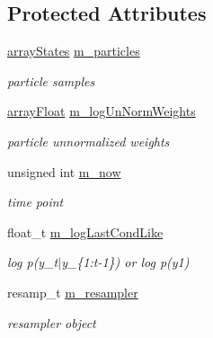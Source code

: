 \subsection*{Protected Attributes}
\begin{DoxyCompactItemize}
\item 
\mbox{\label{classBSFilter_acb5460829dc8215ce2917a24850da444}} 
\hyperlink{classBSFilter_a0afe61a08de8d178647b23beae9eef16}{array\+States} \hyperlink{classBSFilter_acb5460829dc8215ce2917a24850da444}{m\+\_\+particles}
\begin{DoxyCompactList}\small\item\em particle samples \end{DoxyCompactList}\item 
\mbox{\label{classBSFilter_a87e73c82920c3d40b63b544f91b546dd}} 
\hyperlink{classBSFilter_a14a572439ddfe7d2b4157d4c91617981}{array\+Float} \hyperlink{classBSFilter_a87e73c82920c3d40b63b544f91b546dd}{m\+\_\+log\+Un\+Norm\+Weights}
\begin{DoxyCompactList}\small\item\em particle unnormalized weights \end{DoxyCompactList}\item 
\mbox{\label{classBSFilter_a2ff792d36cac3dfb67fad4fb1f49f63c}} 
unsigned int \hyperlink{classBSFilter_a2ff792d36cac3dfb67fad4fb1f49f63c}{m\+\_\+now}
\begin{DoxyCompactList}\small\item\em time point \end{DoxyCompactList}\item 
\mbox{\label{classBSFilter_a488e36bdbc661d121664ca352ef942e8}} 
float\+\_\+t \hyperlink{classBSFilter_a488e36bdbc661d121664ca352ef942e8}{m\+\_\+log\+Last\+Cond\+Like}
\begin{DoxyCompactList}\small\item\em log p(y\+\_\+t$\vert$y\+\_\+\{1\+:t-\/1\}) or log p(y1) \end{DoxyCompactList}\item 
\mbox{\label{classBSFilter_aab4d679d34466613de7b95c3e9411493}} 
resamp\+\_\+t \hyperlink{classBSFilter_aab4d679d34466613de7b95c3e9411493}{m\+\_\+resampler}
\begin{DoxyCompactList}\small\item\em resampler object \end{DoxyCompactList}\item 

\end{DoxyCompactItemize}
